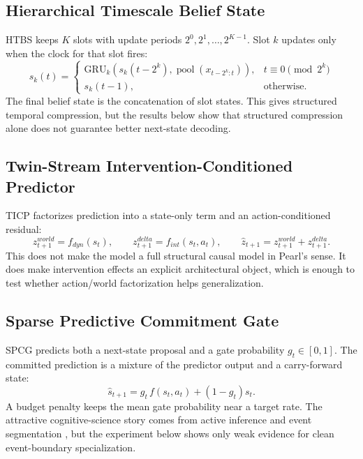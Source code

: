 \documentclass[11pt]{article}
\begin{document}
\subsection{Hierarchical Timescale Belief State}
HTBS keeps $K$ slots with update periods $2^0,2^1,\ldots,2^{K-1}$. Slot $k$ updates only when the clock for that slot fires:
\[
 s_k(t) = \begin{cases}
 \mathrm{GRU}_k\left(s_k(t-2^k), \operatorname{pool}(x_{t-2^k:t})\right), & t \equiv 0 \pmod{2^k} \\
 s_k(t-1), & \text{otherwise.}
 \end{cases}
\]
The final belief state is the concatenation of slot states. This gives structured temporal compression, but the results below show that structured compression alone does not guarantee better next-state decoding.

\subsection{Twin-Stream Intervention-Conditioned Predictor}
TICP factorizes prediction into a state-only term and an action-conditioned residual:
\[
 z^{world}_{t+1} = f_{dyn}(s_t), \qquad z^{delta}_{t+1} = f_{int}(s_t, a_t), \qquad \hat z_{t+1} = z^{world}_{t+1} + z^{delta}_{t+1}.
\]
This does not make the model a full structural causal model in Pearl's sense. It does make intervention effects an explicit architectural object, which is enough to test whether action/world factorization helps generalization.

\subsection{Sparse Predictive Commitment Gate}
SPCG predicts both a next-state proposal and a gate probability $g_t \in [0,1]$. The committed prediction is a mixture of the predictor output and a carry-forward state:
\[
 \hat s_{t+1} = g_t \, f(s_t, a_t) + (1-g_t) s_t.
\]
A budget penalty keeps the mean gate probability near a target rate. The attractive cognitive-science story comes from active inference and event segmentation \citep{friston2017active, zacks2007perception, zacks2007segmentation}, but the experiment below shows only weak evidence for clean event-boundary specialization.
\end{document}
